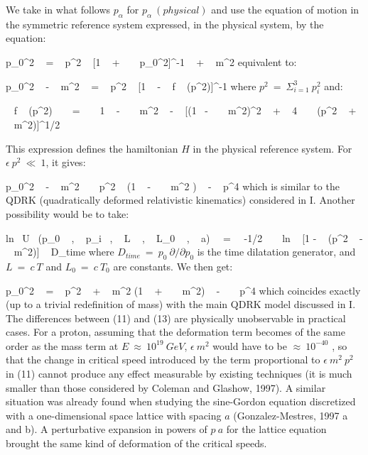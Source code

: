 \documentclass[a4paper,12pt,dvips]{article}
\begin{document}
We take in what follows $p_{\alpha}$ for $p_{\alpha} ~ (physical)$ and use the equation of motion in the symmetric reference system expressed, in the physical system, by the equation:

\equation
p_{0}^2 ~ = ~ p^2 ~ [1 ~ + ~ \epsilon ~ p_0^2]^{-1} ~ + ~ m^2
\endequation
\noindent
equivalent to: 

\equation
p_{0}^2 ~ - ~ m^2 ~ = ~ p^2 ~ [1 ~ - ~ f ~ (p^2)]^{-1}
\endequation
\noindent
where $p^2 ~ = ~ \Sigma _{i=1} ^3 ~ p_i^2$ and:

 ~ f ~ (p^2) ~ ~ = ~  ~ 1 ~ - ~ \epsilon ~ m^2 ~ - ~ [(1~ - ~ \epsilon ~ m^2)^2 ~ + ~ 4 ~ \epsilon ~ (p^2 ~ + ~ m^2)]^{1/2}
\endequation

This expression defines the hamiltonian $H$ in the physical reference system. For $\epsilon ~ p^2 ~ \ll ~ 1$, it gives:

\equation
p_{0}^2 ~ - ~ m^2 ~ \simeq ~ p^2 ~ (1 ~ - ~ \epsilon ~ m^2 ) ~ - ~ \epsilon p^4 
\endequation
\noindent
which is similar to the QDRK (quadratically deformed relativistic kinematics) considered in I. Another possibility would be to take:

\equation
ln ~U~ (p_0 ~ , ~ p_i ~, ~ L ~ , ~ L_0 ~ , ~ a)~~ =~~ -1/2 ~ ~ ln ~ [1 - ~ \epsilon (p^2 ~ - ~ m^2)] ~ D_{time}
\endequation
\noindent
where $D_{time} ~ = ~ p_0 ~ \partial /\partial p_0$ is the time dilatation generator, and $L~=~c~T$ and $L_0~=~c~T_0$ are constants. We then get:

\equation
p_{0}^2 ~ = ~ p^2 ~ + ~ m^2 (1 ~ + ~ \epsilon ~ m^2) ~ - ~ \epsilon ~ p^4 
\endequation
\noindent
which coincides exactly (up to a trivial redefinition of mass) with the main QDRK model discussed in I. The differences between (11) and (13) are physically unobservable in practical cases. For a proton, assuming that the deformation term becomes of the same order as the mass term at $E ~ \approx ~ 10^{19} ~ GeV$, $\epsilon ~ m^2$ would have to be $\approx ~ 10^{-40}$ , so that the change in critical speed introduced by the term proportional to $\epsilon ~ m^2 ~ p^2 $ in (11) cannot produce any effect measurable by existing techniques (it is much smaller than those considered by Coleman and Glashow, 1997). A similar situation was already found when studying the sine-Gordon equation discretized with a one-dimensional space lattice with spacing $a$ (Gonzalez-Mestres, 1997 a and b). A perturbative expansion in powers of  $p ~ a$  for the lattice equation brought the same kind of deformation of the critical speeds.

~ 
\end{document}
